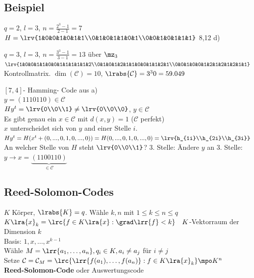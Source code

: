 	\subsection{Beispiel}
			\item $ q=2 $, $ l=3 $, $ n=\frac{2^3-1}{2-1}=7 $\\
				$ H=\lrv{1&0&0&1&0&1&1\\0&1&0&1&1&0&1\\0&0&1&0&1&1&1} $ 8,12 d)
			\item $ q=3 $, $l=3$, $n=\frac{3^3-1}{3-1}=13$ über $ \mz_3 $\\
				$ \lrv{1&0&0&1&1&0&0&1&1&1&1&1&2\\0&1&0&1&2&1&1&0&0&1&1&2&1\\0&0&1&0&0&1&2&1&2&1&2&1&1} $ Kontrollmatrix. $ \dim(\mathcal{C})=10 $, $ \lrabs{\mathcal{C}}=3^30=59.049 $
			\item  $ [7,4] $- Hamming- Code aus a)\\
				$ y=(1110110)\in \mathcal{C} $\\
				$ Hy^t=\lrv{0\\0\\1}\neq\lrv{0\\0\\0} $, $ y\in \mathcal{C} $\\
				Es gibt genau ein $ x\in \mathcal{C} $ mit $ d(x,y)=1 $ ($ \mathcal{C} $ perfekt)\\
				$ x $ unterscheidet sich von $ y $ and einer Stelle $ i $.\\
				$ Hy^t=H(x^t+(0,...,0,1,0,...,0))=H(0,...,0,1,0,...,0)=\lrv{h_{1i}\\h_{2i}\\h_{3i}} $\\
				An welcher Stelle von $ H $ steht $ \lrv{0\\0\\1} $? 3. Stelle: Ändere $ y $ an 3. Stelle: $ y\rightarrow x=\underbrace{(1100110)}_{\in \mathcal{C}} $
		\subExEnd
	
	\subsection{Reed-Solomon-Codes}
			\item $K$ Körper, $\lrabs{K}=q$. Wähle $k,n$ mit $1\leq k\leq n\leq q$\\
				$K\lra{x}_k=\lrc{f\in K\lra{x}: \grad\lrr{f}<k}\quad K$-Vektorraum der Dimension $k$\\
				Basis: $1,x,\dots,x^{k-1}$\\
				Wähle $M=\lrr{a_1,\dots,a_n}, q_i\in K, a_i\neq a_j$ für $i\neq j$\\
				Setze $\mathcal{C}=\mathcal{C}_M=\lrc{\lrr{f(a_1),\dots,f(a_n)}:f\in K\lra{x}_k}\mpo K^n$\\
				\textbf{Reed-Solomon-Code} oder Auswertungscode
			
